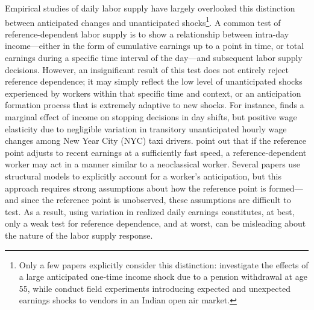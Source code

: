 \documentclass[reviewmode,AEJ]{AEA}
\begin{document}
Empirical studies of daily labor supply have largely overlooked this distinction between 
anticipated changes and unanticipated shocks\footnote{ Only a few papers explicitly consider this 
distinction: \citet{agarwal2017anticipated} investigate the effects of a large anticipated one-time 
income shock due to a pension withdrawal at age 55, while \citet{andersen2014toward} conduct field 
experiments  introducing expected and unexpected earnings shocks to vendors in an Indian 
open air market.}. A common test of reference-dependent labor supply is to show a relationship 
between intra-day income---either in the form of cumulative earnings up to a point in time, or 
total earnings during a specific time interval of the day---and subsequent labor supply decisions. 
However, an insignificant result of this test does not entirely reject reference dependence; it may 
simply reflect the low level of unanticipated shocks experienced by workers within that specific time 
and context, or an anticipation formation process that is extremely adaptive to new shocks. 
For instance, \citet{farber2015you} finds a marginal effect of income on stopping decisions in day 
shifts, but positive wage elasticity due to negligible variation in transitory unanticipated hourly 
wage changes among New Year City (NYC) taxi drivers. \citet{thakral2018daily} point out that if the 
reference point adjusts to recent earnings at a sufficiently fast speed, a reference-dependent worker 
may act in a manner similar to a neoclassical worker. Several papers use structural models to 
explicitly account for a worker's anticipation, but this approach requires strong assumptions about 
how the reference point is formed---and since the reference point is unobserved, these assumptions 
are difficult to test. As a result, using variation in realized daily earnings constitutes, at best, 
only a weak test for reference dependence, and at worst, can be misleading about the nature of the 
labor supply response.
\end{document}
